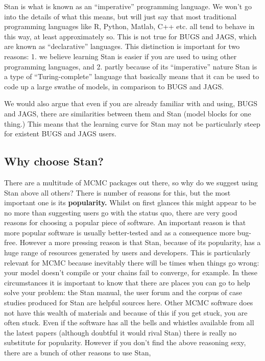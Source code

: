 \documentclass[11pt,fullpage]{book}
\begin{document}
Stan is what is known as an ``imperative'' programming language. We won't go into the details of what this means, but will just say that most traditional programming languages like R, Python, Matlab, C++ etc. all tend to behave in this way, at least approximately so. This is not true for BUGS and JAGS, which are known as ``declarative'' languages. This distinction is important for two reasons: 1. we believe learning Stan is easier if you are used to using other programming languages, and 2. partly because of its ``imperative'' nature Stan is a type of ``Turing-complete'' language that basically means that it can be used to code up a large swathe of models, in comparison to BUGS and JAGS.

We would also argue that even if you are already familiar with and using, BUGS and JAGS, there are similarities between them and Stan (model blocks for one thing.) This means that the learning curve for Stan may not be particularly steep for existent BUGS and JAGS users.

\subsection{Why choose Stan?}
There are a multitude of MCMC packages out there, so why do we suggest using Stan above all others? There is number of reasons for this, but the most important one is its \textbf{popularity.} Whilst on first glances this might appear to be no more than suggesting users go with the status quo, there are very good reasons for choosing a popular piece of software. An important reason is that more popular software is usually better-tested and as a consequence more bug-free. However a more pressing reason is that Stan, because of its popularity, has a huge range of resources generated by users and developers. This is particularly relevant for MCMC because inevitably there will be times when things go wrong: your model doesn't compile or your chains fail to converge, for example. In these circumstances it is important to know that there are places you can go to help solve your problem: the Stan manual, the user forum and the corpus of case studies produced for Stan are helpful sources here. Other MCMC software does not have this wealth of materials and because of this if you get stuck, you are often stuck. Even if the software has all the bells and whistles available from all the latest papers (although doubtful it would rival Stan) there is really no substitute for popularity. However if you don't find the above reasoning sexy, there are a bunch of other reasons to use Stan,
\end{document}

